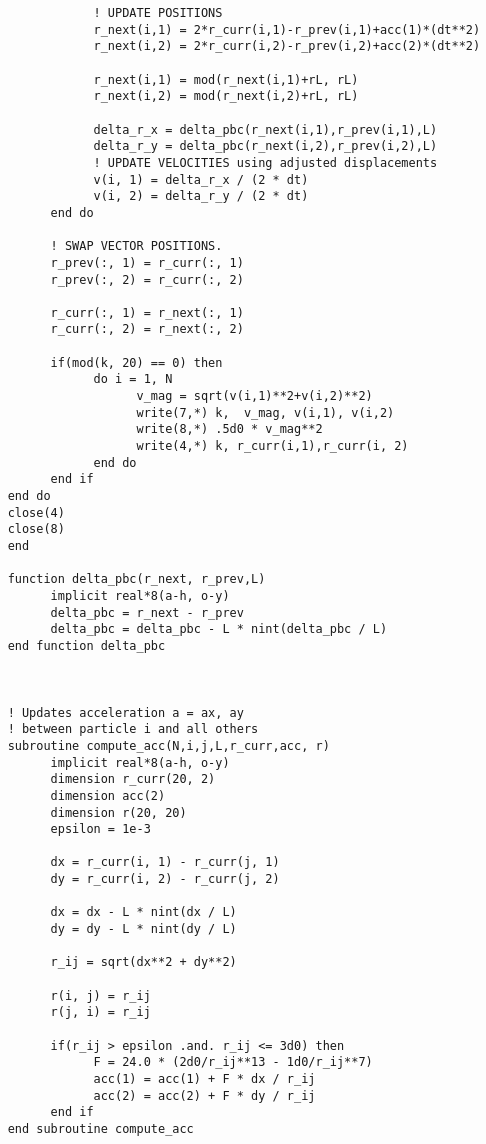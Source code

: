 \begin{verbatim}
                ! UPDATE POSITIONS
                r_next(i,1) = 2*r_curr(i,1)-r_prev(i,1)+acc(1)*(dt**2)
                r_next(i,2) = 2*r_curr(i,2)-r_prev(i,2)+acc(2)*(dt**2)      

                r_next(i,1) = mod(r_next(i,1)+rL, rL)
                r_next(i,2) = mod(r_next(i,2)+rL, rL)

                delta_r_x = delta_pbc(r_next(i,1),r_prev(i,1),L)
                delta_r_y = delta_pbc(r_next(i,2),r_prev(i,2),L)
                ! UPDATE VELOCITIES using adjusted displacements
                v(i, 1) = delta_r_x / (2 * dt)
                v(i, 2) = delta_r_y / (2 * dt)
          end do

          ! SWAP VECTOR POSITIONS.
          r_prev(:, 1) = r_curr(:, 1)
          r_prev(:, 2) = r_curr(:, 2)

          r_curr(:, 1) = r_next(:, 1)
          r_curr(:, 2) = r_next(:, 2)

          if(mod(k, 20) == 0) then
                do i = 1, N
                      v_mag = sqrt(v(i,1)**2+v(i,2)**2)
                      write(7,*) k,  v_mag, v(i,1), v(i,2)
                      write(8,*) .5d0 * v_mag**2
                      write(4,*) k, r_curr(i,1),r_curr(i, 2)
                end do
          end if
    end do
    close(4)
    close(8)
    end 

    function delta_pbc(r_next, r_prev,L)
          implicit real*8(a-h, o-y)
          delta_pbc = r_next - r_prev
          delta_pbc = delta_pbc - L * nint(delta_pbc / L)
    end function delta_pbc



    ! Updates acceleration a = ax, ay 
    ! between particle i and all others
    subroutine compute_acc(N,i,j,L,r_curr,acc, r)
          implicit real*8(a-h, o-y)
          dimension r_curr(20, 2)
          dimension acc(2)
          dimension r(20, 20)
          epsilon = 1e-3

          dx = r_curr(i, 1) - r_curr(j, 1)
          dy = r_curr(i, 2) - r_curr(j, 2)

          dx = dx - L * nint(dx / L)
          dy = dy - L * nint(dy / L)

          r_ij = sqrt(dx**2 + dy**2)

          r(i, j) = r_ij 
          r(j, i) = r_ij

          if(r_ij > epsilon .and. r_ij <= 3d0) then 
                F = 24.0 * (2d0/r_ij**13 - 1d0/r_ij**7)
                acc(1) = acc(1) + F * dx / r_ij 
                acc(2) = acc(2) + F * dy / r_ij
          end if 
    end subroutine compute_acc


\end{verbatim}
